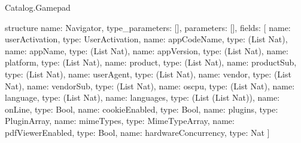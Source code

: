 \begin{lexlean}{Catalog.Gamepad}
\begin{semanticmodule}
structure{
  name: Navigator,
  type_parameters: [],
  parameters: [],
  fields: [
    {name: userActivation, type: UserActivation},
    {name: appCodeName, type: (List Nat)},
    {name: appName, type: (List Nat)},
    {name: appVersion, type: (List Nat)},
    {name: platform, type: (List Nat)},
    {name: product, type: (List Nat)},
    {name: productSub, type: (List Nat)},
    {name: userAgent, type: (List Nat)},
    {name: vendor, type: (List Nat)},
    {name: vendorSub, type: (List Nat)},
    {name: oscpu, type: (List Nat)},
    {name: language, type: (List Nat)},
    {name: languages, type: (List (List Nat))},
    {name: onLine, type: Bool},
    {name: cookieEnabled, type: Bool},
    {name: plugins, type: PluginArray},
    {name: mimeTypes, type: MimeTypeArray},
    {name: pdfViewerEnabled, type: Bool},
    {name: hardwareConcurrency, type: Nat}
  ]
}
\end{semanticmodule}
\end{lexlean}
